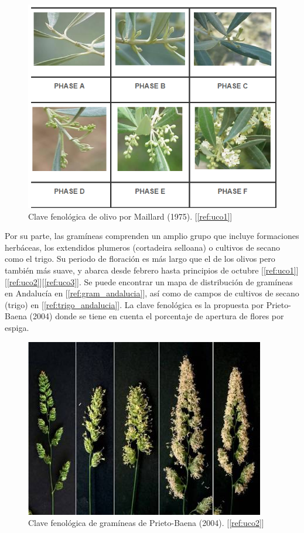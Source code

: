 \documentclass[12pt,oneside,a4paper]{article}
\numberwithin{figure}{section}
\begin{document}
\begin{figure}[H]
\begin{center}
\includegraphics[scale=.7]{clave_olivo.png}
\caption{Clave fenológica de olivo por Maillard (1975). [\ref{ref:uco1}]}
\label{fig:clave_olivo}
\end{center}
\end{figure}

Por su parte, las gramíneas comprenden un amplio grupo que incluye formaciones herbáceas, los extendidos plumeros (cortadeira selloana) o cultivos de secano como el trigo. Su periodo de floración es más largo que el de los olivos pero también más suave, y abarca desde febrero hasta principios de octubre [\ref{ref:uco1}][\ref{ref:uco2}][\ref{ref:uco3}]. Se puede encontrar un mapa de distribución de gramíneas en Andalucía en [\ref{ref:gram_andalucia}], así como de campos de cultivos de secano (trigo) en [\ref{ref:trigo_andalucia}]. La clave fenológica es la propuesta por Prieto-Baena (2004) donde se tiene en cuenta el porcentaje de apertura de flores por espiga.

\begin{figure}[H]
\begin{center}
\includegraphics[scale=.8]{clave_gram.jpg}
\caption{Clave fenológica de gramíneas de Prieto-Baena (2004). [\ref{ref:uco2}]}
\label{fig:clave_gram}
\end{center}
\end{figure}
\end{document}
